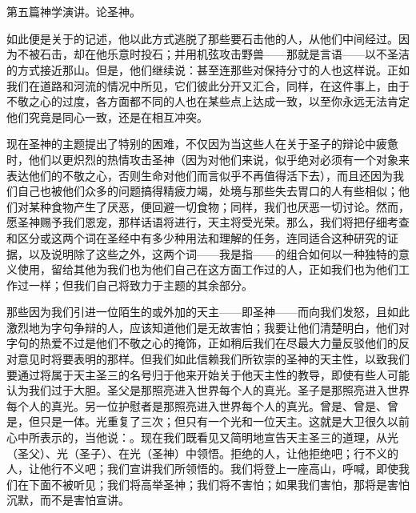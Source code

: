 

\section{}

第五篇神学演讲。论圣神。\par

如此便是关于的记述，他以此方式逃脱了那些要石击他的人，从他们中间经过。因为不被石击，却在他乐意时投石；并用机弦攻击野兽——那就是言语——以不圣洁的方式接近那山。但是，他们继续说：甚至连那些对保持分寸的人也这样说。正如我们在道路和河流的情况中所见，它们彼此分开又汇合，同样，在这件事上，由于不敬之心的过度，各方面都不同的人也在某些点上达成一致，以至你永远无法肯定他们究竟是同心一致，还是在相互冲突。\par

现在圣神的主题提出了特别的困难，不仅因为当这些人在关于圣子的辩论中疲惫时，他们以更炽烈的热情攻击圣神（因为对他们来说，似乎绝对必须有一个对象来表达他们的不敬之心，否则生命对他们而言似乎不再值得活下去），而且还因为我们自己也被他们众多的问题搞得精疲力竭，处境与那些失去胃口的人有些相似；他们对某种食物产生了厌恶，便回避一切食物；同样，我们也厌恶一切讨论。然而，愿圣神赐予我们恩宠，那样话语将进行，天主将受光荣。那么，我们将把仔细考查和区分或这两个词在圣经中有多少种用法和理解的任务，连同适合这种研究的证据，以及说明除了这些之外，这两个词——我是指——的组合如何以一种独特的意义使用，留给其他为我们也为他们自己在这方面工作过的人，正如我们也为他们工作过一样；但我们自己将致力于主题的其余部分。\par

那些因为我们引进一位陌生的或外加的天主——即圣神——而向我们发怒，且如此激烈地为字句争辩的人，应该知道他们是无故害怕；我要让他们清楚明白，他们对字句的热爱不过是他们不敬之心的掩饰，正如稍后我们在尽最大力量反驳他们的反对意见时将要表明的那样。但我们如此信赖我们所钦崇的圣神的天主性，以致我们要通过将属于天主圣三的名号归于他来开始关于他天主性的教导，即使有些人可能认为我们过于大胆。圣父是那照亮进入世界每个人的真光。圣子是那照亮进入世界每个人的真光。另一位护慰者是那照亮进入世界每个人的真光。曾是、曾是、曾是，但只是一体。光重复了三次；但只有一个光和一位天主。这就是大卫很久以前心中所表示的，当他说：。现在我们既看见又简明地宣告天主圣三的道理，从光（圣父）、光（圣子）、在光（圣神）中领悟。拒绝的人，让他拒绝吧；行不义的人，让他行不义吧；我们宣讲我们所领悟的。我们将登上一座高山，呼喊，即使我们在下面不被听见；我们将高举圣神；我们将不害怕；如果我们害怕，那将是害怕沉默，而不是害怕宣讲。\par

